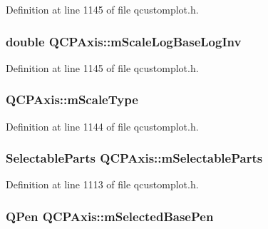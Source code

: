 Definition at line 1145 of file qcustomplot.\-h.

\hypertarget{class_q_c_p_axis_a93e068984b475467929e7f6768754227}{
\subsubsection[{m\-Scale\-Log\-Base\-Log\-Inv}]{\setlength{\rightskip}{0pt plus 5cm}double Q\-C\-P\-Axis\-::m\-Scale\-Log\-Base\-Log\-Inv\hspace{0.3cm}{\ttfamily [protected]}}}\label{class_q_c_p_axis_a93e068984b475467929e7f6768754227}


Definition at line 1145 of file qcustomplot.\-h.

\hypertarget{class_q_c_p_axis_ad706039549cbbbec5fcb2baf7894e04d}{
\subsubsection[{m\-Scale\-Type}]{ Q\-C\-P\-Axis\-::m\-Scale\-Type\hspace{0.3cm}{\ttfamily [protected]}}}\label{class_q_c_p_axis_ad706039549cbbbec5fcb2baf7894e04d}


Definition at line 1144 of file qcustomplot.\-h.

\hypertarget{class_q_c_p_axis_ab9042d8a095998f27a28b39411d8b9c3}{
\subsubsection[{m\-Selectable\-Parts}]{\setlength{\rightskip}{0pt plus 5cm}Selectable\-Parts Q\-C\-P\-Axis\-::m\-Selectable\-Parts\hspace{0.3cm}{\ttfamily [protected]}}}\label{class_q_c_p_axis_ab9042d8a095998f27a28b39411d8b9c3}


Definition at line 1113 of file qcustomplot.\-h.

\hypertarget{class_q_c_p_axis_a80baa4e3c16f9b6edf3eccacd2a50fde}{
\subsubsection[{m\-Selected\-Base\-Pen}]{\setlength{\rightskip}{0pt plus 5cm}Q\-Pen Q\-C\-P\-Axis\-::m\-Selected\-Base\-Pen\hspace{0.3cm}{\ttfamily [protected]}}}\label{class_q_c_p_axis_a80baa4e3c16f9b6edf3eccacd2a50fde}


